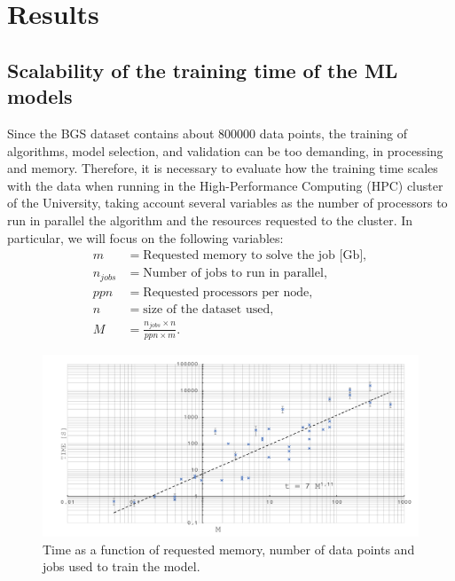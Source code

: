 \chapter{Results}

\section{Scalability of the training time of the ML models} %

Since the BGS dataset contains about 800000 data points, the training of algorithms, model selection, and validation can be too demanding, in processing and memory. Therefore, it is necessary to evaluate how the training time scales with the data when running in the High-Performance Computing (HPC) cluster of the University, taking account several variables as the number of processors to run in parallel the algorithm and the resources requested to the cluster. In particular, we will focus on the following variables:
\begin{align*}
m &= \text{Requested memory to solve the job [Gb]},\\
n_{jobs} &= \text{Number of jobs to run in parallel},\\
ppn &= \text{Requested processors per node},\\
n &= \text{size of the dataset used},\\
M &= \frac{n_{jobs} \times n}{ppn \times m}.
\end{align*}
\begin{figure}[ht!]
	\centering
	\includegraphics[width=1.0\linewidth]{TeX_files/Imagenes/hpc_results}
	\caption{Time as a function of requested memory, number of data points and jobs used to train the model.}
	\label{fig:hpcresults}
\end{figure}

